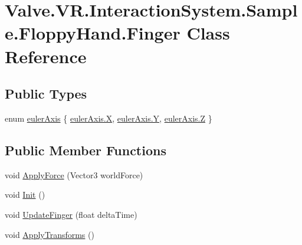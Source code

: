 \hypertarget{class_valve_1_1_v_r_1_1_interaction_system_1_1_sample_1_1_floppy_hand_1_1_finger}{}\section{Valve.\+V\+R.\+Interaction\+System.\+Sample.\+Floppy\+Hand.\+Finger Class Reference}
\label{class_valve_1_1_v_r_1_1_interaction_system_1_1_sample_1_1_floppy_hand_1_1_finger}
\subsection*{Public Types}
\begin{DoxyCompactItemize}
\item 
enum \mbox{\hyperlink{class_valve_1_1_v_r_1_1_interaction_system_1_1_sample_1_1_floppy_hand_1_1_finger_ab6442b559d46bdb7c1a046dcba1fa76d}{euler\+Axis}} \{ \mbox{\hyperlink{class_valve_1_1_v_r_1_1_interaction_system_1_1_sample_1_1_floppy_hand_1_1_finger_ab6442b559d46bdb7c1a046dcba1fa76da02129bb861061d1a052c592e2dc6b383}{euler\+Axis.\+X}}, 
\mbox{\hyperlink{class_valve_1_1_v_r_1_1_interaction_system_1_1_sample_1_1_floppy_hand_1_1_finger_ab6442b559d46bdb7c1a046dcba1fa76da57cec4137b614c87cb4e24a3d003a3e0}{euler\+Axis.\+Y}}, 
\mbox{\hyperlink{class_valve_1_1_v_r_1_1_interaction_system_1_1_sample_1_1_floppy_hand_1_1_finger_ab6442b559d46bdb7c1a046dcba1fa76da21c2e59531c8710156d34a3c30ac81d5}{euler\+Axis.\+Z}}
 \}
\end{DoxyCompactItemize}
\subsection*{Public Member Functions}
\begin{DoxyCompactItemize}
\item 
void \mbox{\hyperlink{class_valve_1_1_v_r_1_1_interaction_system_1_1_sample_1_1_floppy_hand_1_1_finger_adcb12cad50c49ec8e3945f8ecce74d27}{Apply\+Force}} (Vector3 world\+Force)
\item 
void \mbox{\hyperlink{class_valve_1_1_v_r_1_1_interaction_system_1_1_sample_1_1_floppy_hand_1_1_finger_af5800fb862c4a3bdb9ee479a063c4517}{Init}} ()
\item 
void \mbox{\hyperlink{class_valve_1_1_v_r_1_1_interaction_system_1_1_sample_1_1_floppy_hand_1_1_finger_a2d9bc5d7e464efe9b7b25571fd5156ec}{Update\+Finger}} (float delta\+Time)
\item 
void \mbox{\hyperlink{class_valve_1_1_v_r_1_1_interaction_system_1_1_sample_1_1_floppy_hand_1_1_finger_aa1305770f2889e238ec71ad61932beee}{Apply\+Transforms}} ()
\end{DoxyCompactItemize}
